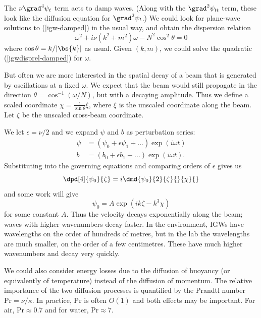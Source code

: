 The $\nu\grad^4\psi_t$ term acts to damp waves. (Along with the
$\grad^2\psi_{tt}$ term, these look like the diffusion equation for
$\grad^2\psi_t$.) We could look for plane-wave solutions to (\ref{igw-damped})
in the usual way, and obtain the dispersion relation
\begin{equation}
	\omega^2 + i\nu(k^2+m^2)\omega - N^2\cos^2\theta = 0
	\label{igwdisprel-damped}
\end{equation}
where $\cos\theta = k/|\bs{k}|$ as usual. Given $(k,m)$, we could solve
the quadratic (\ref{igwdisprel-damped}) for $\omega$. 

But often we are more interested in the spatial decay of a beam that is
generated by oscillations at a fixed $\omega$. We expect that the beam would
still propagate in the direction $\theta = \cos^{-1} (\omega/N)$, but with a
decaying amplitude. Thus we define a scaled coordinate 
$\chi = \frac{\epsilon}{\sin\theta} \xi$, where $\xi$ is the unscaled coordinate
along the beam. Let $\zeta$ be the unscaled cross-beam coordinate.

We let $\epsilon = \nu/2$ and we expand $\psi$ and $b$ as perturbation series:
\begin{align}
    \psi &= (\psi_0 + \epsilon \psi_1 + ...)\exp(i\omega t) \\
    b &= (b_0 + \epsilon b_1 + ... ) \exp(i\omega t).
\end{align}
Substituting into the governing equations and comparing orders of $\epsilon$
gives us 
\begin{equation}
    \dpd[4]{\psi_0}{\zeta} = i\dmd{\psi_0}{2}{\zeta}{}{\chi}{}
\end{equation}
and some work will give 
\begin{equation}
    \psi_0 = A \exp(ik\zeta - k^3 \chi)
\end{equation}
for some constant $A$. Thus the velocity decays exponentially along the beam;
waves with higher wavenumbers decay faster. In the environment, IGWs have
wavelengths on the order of hundreds of metres, but in the lab the wavelengths
are much smaller, on the order of a few centimetres. These have much higher
wavenumbers and decay very quickly.

We could also consider energy losses due to the diffusion of buoyancy (or
equivalently of temperature) instead of the diffusion of momentum. The relative
importance of the two diffusion processes is quantified by the Prandtl number
$\mathrm{Pr} = \nu/\kappa$. In practice, $\mathrm{Pr}$ is often $O(1)$ and both
effects may be important. For air, $\mathrm{Pr} \approx 0.7$ and for water,
$\mathrm{Pr} \approx 7$. 

